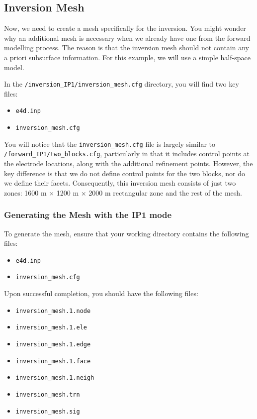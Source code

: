 \documentclass[a4paper,12pt]{article}
\begin{document}
\subsection{Inversion Mesh}

Now, we need to create a mesh specifically for the inversion. You might wonder why an additional mesh is necessary when we already have one from the forward modelling process. The reason is that the inversion mesh should not contain any a priori subsurface information. For this example, we will use a simple half-space model.

In the \texttt{/inversion\_IP1/inversion\_mesh.cfg} directory, you will find two key files:

\begin{itemize}
    \item \texttt{e4d.inp}
    \item \texttt{inversion\_mesh.cfg}
\end{itemize}

You will notice that the \texttt{inversion\_mesh.cfg} file is largely similar to \texttt{/forward\_IP1/two\_blocks.cfg}, particularly in that it includes control points at the electrode locations, along with the additional refinement points. However, the key difference is that we do not define control points for the two blocks, nor do we define their facets. Consequently, this inversion mesh consists of just two zones: 1600 m × 1200 m × 2000 m rectangular zone and the rest of the mesh.

\subsubsection{Generating the Mesh with the IP1 mode}

To generate the mesh, ensure that your working directory contains the following files:

\begin{itemize}
    \item \texttt{e4d.inp}
    \item \texttt{inversion\_mesh.cfg}
\end{itemize}

Upon successful completion, you should have the following files:

\begin{itemize}
    \item \texttt{inversion\_mesh.1.node}
    \item \texttt{inversion\_mesh.1.ele}
    \item \texttt{inversion\_mesh.1.edge}
    \item \texttt{inversion\_mesh.1.face}
    \item \texttt{inversion\_mesh.1.neigh}
    \item \texttt{inversion\_mesh.trn}
    \item \texttt{inversion\_mesh.sig}
\end{itemize}
\end{document}

